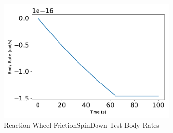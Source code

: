 \begin{figure}[htbp]\centerline{\includegraphics[width=0.8\textwidth]{AutoTeX/ReactionWheelFrictionSpinDownTestBodyRates}}\caption{Reaction Wheel FrictionSpinDown Test Body Rates}\label{fig:ReactionWheelFrictionSpinDownTestBodyRates}\end{figure}